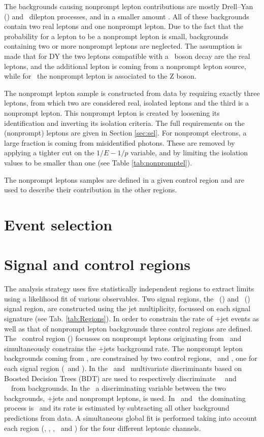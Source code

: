 The backgrounds causing nonprompt lepton contributions are mostly Drell--Yan (\DY) and \ttbar\ dilepton processes, and in a smaller amount \WW. All of these backgrounds contain two real leptons and one nonprompt lepton. Due to the fact that the probability for a lepton to be a nonprompt lepton is small, backgrounds containing two or more nonprompt leptons are neglected. The assumption is made that for DY the two leptons compatible with a \PZ\ boson decay are the real leptons, and the additional lepton is coming from a nonprompt lepton source, while for \ttbar\ the nonprompt lepton is associated to the Z boson. 

The nonprompt lepton sample is constructed from data by requiring exactly three leptons, from which two are considered real, isolated leptons and the third is a nonprompt lepton. This nonprompt lepton is created by loosening its identification and inverting its isolation criteria. The full requirements on the (nonprompt) leptons are given in Section \ref{sec:sel}. 
For nonprompt electrons, a large fraction is coming from misidentified photons. These are removed by applying a tighter cut on the $1/E-1/p$ variable, and by limiting the isolation values to be smaller than one (see Table \ref{tab:nonpromptel}). 

The nonprompt leptons samples are defined in a given control region and are used to describe their contribution in the other regions. 

\section{Event selection}
\label{sec:selection}

\section{Signal and control regions}
The analysis strategy uses five statistically independent regions to extract limits using a likelihood fit of various observables. Two signal regions, the \tZ\ (\STSR) and \tZq\ (\TTSR) signal region, are constructed using the jet multiplicity,  focussed on each signal signature (see Tab. \ref{tab:Regions}).  In order to constrain the rate of \WZ+jet events as well as that of nonprompt lepton backgrounds three control regions are defined. The \WZ\ control region (\WZCR) focusses on nonprompt leptons originating from \DY\ and simultaneously constrains the \WZ+jets background rate. The nonprompt lepton backgrounds coming from \ttbar, are constrained by two control regions, \TTCR\ and \STCR, one for each signal region (\TTSR\ and \STSR).  In the \STSR\ and \TTSR\, multivariate discriminants based on Boosted Decision Trees (BDT) are used to respectively discriminate \FCNC\ \tZ\ and \FCNC\ \tZq\ from backgrounds. In the \WZCR\ a  discriminating variable between the two backgrounds, \WZ+jets and nonprompt leptons, is used. In \TTCR\ and \STCR\, the dominating process is \ttbar\, and its rate is estimated by subtracting all other background predictions from data. A simultaneous global fit is performed taking into account each region (\STSR, \TTSR, \WZCR, \TTCR\ and \STCR) for the four different leptonic channels. 


